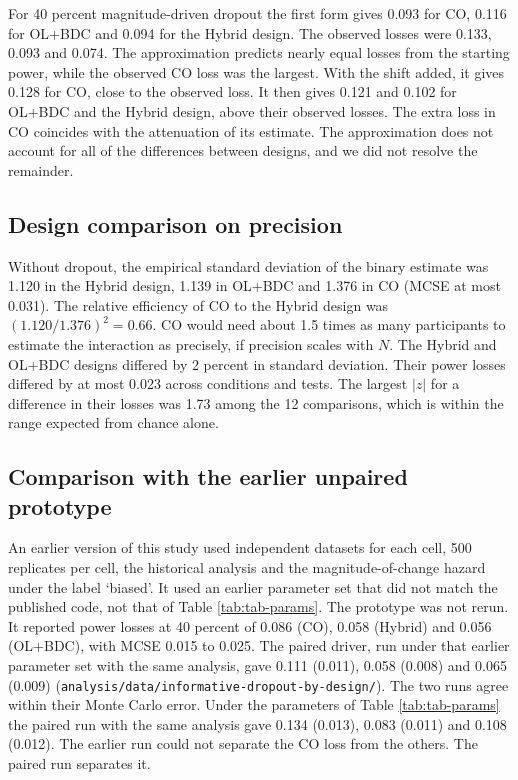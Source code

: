 \documentclass[
  11pt,
]{article}
\begin{document}
For 40 percent magnitude-driven dropout the first form gives
0.093 for CO,
0.116 for OL+BDC and
0.094 for the Hybrid design.
The observed losses were
0.133,
0.093 and
0.074. The
approximation predicts nearly equal losses from the starting power,
while the observed CO loss was the largest. With the shift added, it
gives 0.128 for CO, close to
the observed loss. It then gives
0.121 and
0.102 for OL+BDC and the
Hybrid design, above their observed losses. The extra loss in CO
coincides with the attenuation of its estimate. The approximation does
not account for all of the differences between designs, and we did not
resolve the remainder.

\subsection{Design comparison on precision}\label{sec-design-compare}

Without dropout, the empirical standard deviation of the binary
estimate was 1.120 in the Hybrid design, 1.139 in
OL+BDC and 1.376 in CO (MCSE at most
0.031).
The relative efficiency of CO to the Hybrid design was
\((1.120/1.376)^2 = 0.66\). CO would need about
1.5 times as many participants to estimate
the interaction as precisely, if precision scales with \(N\). The Hybrid
and OL+BDC designs differed by
2 percent in standard
deviation. Their power losses differed by at most
0.023
across conditions and tests. The largest \(|z|\) for a
difference in their losses was
1.73
among the
12
comparisons, which is within the range expected from chance alone.

\subsection{Comparison with the earlier unpaired prototype}\label{sec-old}

An earlier version of this study used independent datasets for each
cell, 500
replicates per cell, the historical analysis and the
magnitude-of-change hazard under the label `biased'. It used an
earlier parameter set that did not match the published code, not that
of Table \ref{tab:tab-params}. The prototype was not rerun. It
reported power losses at 40 percent of
0.086
(CO),
0.058
(Hybrid) and
0.056
(OL+BDC), with MCSE
0.015 to 0.025. The paired driver, run
under that earlier parameter set with the same analysis, gave
0.111 (0.011),
0.058 (0.008) and
0.065 (0.009)
(\texttt{analysis/data/informative-dropout-by-design/}). The two runs agree
within their Monte Carlo error. Under the parameters of Table
\ref{tab:tab-params} the paired run with the same analysis gave
0.134 (0.013),
0.083 (0.011)
and
0.108 (0.012).
The earlier run could not separate the CO loss from the others. The
paired run separates it.
\end{document}
